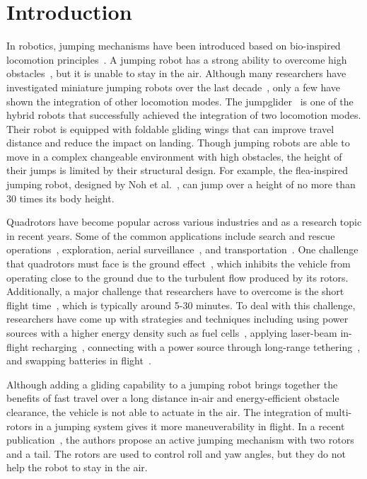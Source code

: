 \documentclass[letterpaper,10pt,conference]{ieeeconf}
\newcommand{\brian}[1]{{\color{brown}#1}}
\begin{document}
\section{Introduction}
\noindent
In robotics, jumping mechanisms have been introduced based on bio-inspired locomotion principles~\cite{article,Truong_2019}. 
A jumping robot has a strong ability to overcome high obstacles~\cite{article}, but it is unable to stay in the air. 
Although many researchers have investigated miniature jumping robots over the last decade~\cite{6204349, woodward2011design, kovac2008miniature}, only a few have shown the integration of other locomotion modes. The  jumpglider~\cite{6181502} is one of the hybrid robots that successfully achieved the integration of two locomotion modes. Their robot is equipped with foldable gliding wings that can improve travel distance and reduce the impact on landing. Though jumping robots are able to move in a complex changeable environment with high obstacles, the height of their jumps is limited by their structural design.
For example, the flea-inspired jumping robot, designed by Noh et al.~\cite{6204349}, can jump over a height of no more than 30 times its body height.

Quadrotors have become popular across various industries and as a research topic in recent years. Some of the common applications include search and rescue operations~\cite{naidoo2011development}, exploration, aerial surveillance~\cite{LAGRING2012644}, and transportation~\cite{loianno2017cooperative}. One challenge that quadrotors must face is the ground effect~\cite{powers2013influence}, which inhibits the vehicle from operating close to the ground due to the turbulent flow produced by its rotors.
Additionally, a major challenge that researchers have to overcome is the short flight time~\cite{BOUKOBERINE2019113823}, which is typically around 5-30 minutes. To deal with this challenge, researchers have come up with strategies and techniques including using power sources with a higher energy density such as fuel cells~\cite{10.1115/IMECE2012-88871}, applying laser-beam in-flight recharging~\cite{8403572,6094731}, connecting with a power source through long-range tethering~\cite{MUTTIN2011332}, and swapping batteries in flight~\cite{9197580}.

Although adding a gliding capability to a jumping robot \cite{6181502} brings together the benefits of fast travel over a long distance in-air and energy-efficient obstacle clearance, the vehicle is not able to actuate in the air.
The integration of multi-rotors in a jumping system gives it more maneuverability in flight. 
In a recent publication~\cite{haldane2017repetitive}, the authors propose an active jumping mechanism with two rotors and a tail. The rotors are used to control roll and yaw angles, but they do not help the robot to stay in the air.
\end{document}
